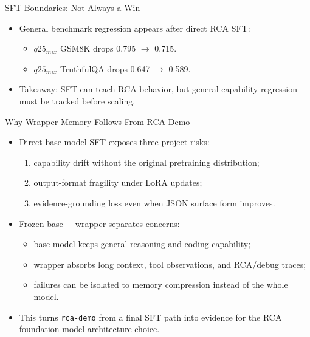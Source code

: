 \begin{frame}{SFT Boundaries: Not Always a Win}
  \begin{itemize}
    \item General benchmark regression appears after direct RCA SFT:
      \begin{itemize}
        \item $q25_{mix}$ GSM8K drops 0.795 $\rightarrow$ 0.715.
        \item $q25_{mix}$ TruthfulQA drops 0.647 $\rightarrow$ 0.589.
      \end{itemize}
    \item Takeaway: SFT can teach RCA behavior, but general-capability regression must be tracked before scaling.
  \end{itemize}
\end{frame}

\begin{frame}{Why Wrapper Memory Follows From RCA-Demo}
  \begin{itemize}
    \item Direct base-model SFT exposes three project risks:
      \begin{enumerate}
        \item capability drift without the original pretraining distribution;
        \item output-format fragility under LoRA updates;
        \item evidence-grounding loss even when JSON surface form improves.
      \end{enumerate}
    \item Frozen base + wrapper separates concerns:
      \begin{itemize}
        \item base model keeps general reasoning and coding capability;
        \item wrapper absorbs long context, tool observations, and RCA/debug traces;
        \item failures can be isolated to memory compression instead of the whole model.
      \end{itemize}
    \item This turns \texttt{rca-demo} from a final SFT path into evidence for the RCA foundation-model architecture choice.
  \end{itemize}
\end{frame}

